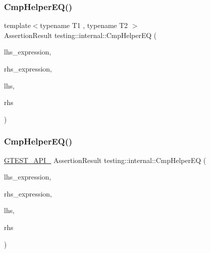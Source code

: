 \mbox{\label{namespacetesting_1_1internal_a4638c74d9b32e971f9b321af6fafc2f1}} 
\subsubsection{\texorpdfstring{Cmp\+Helper\+E\+Q()}{CmpHelperEQ()}\hspace{0.1cm}{\footnotesize\ttfamily [1/2]}}
{\footnotesize\ttfamily template$<$typename T1 , typename T2 $>$ \\
Assertion\+Result testing\+::internal\+::\+Cmp\+Helper\+EQ (\begin{DoxyParamCaption}\item[{const char $\ast$}]{lhs\+\_\+expression,  }\item[{const char $\ast$}]{rhs\+\_\+expression,  }\item[{const T1 \&}]{lhs,  }\item[{const T2 \&}]{rhs }\end{DoxyParamCaption})}

\mbox{\label{namespacetesting_1_1internal_a1edf90480571c0659a39d13e3777d9ce}} 
\subsubsection{\texorpdfstring{Cmp\+Helper\+E\+Q()}{CmpHelperEQ()}\hspace{0.1cm}{\footnotesize\ttfamily [2/2]}}
{\footnotesize\ttfamily \hyperlink{gtest-port_8h_aa73be6f0ba4a7456180a94904ce17790}{G\+T\+E\+S\+T\+\_\+\+A\+P\+I\+\_\+} Assertion\+Result testing\+::internal\+::\+Cmp\+Helper\+EQ (\begin{DoxyParamCaption}\item[{const char $\ast$}]{lhs\+\_\+expression,  }\item[{const char $\ast$}]{rhs\+\_\+expression,  }\item[{\hyperlink{namespacetesting_1_1internal_a05c6bd9ede5ccdf25191a590d610dcc6}{Biggest\+Int}}]{lhs,  }\item[{\hyperlink{namespacetesting_1_1internal_a05c6bd9ede5ccdf25191a590d610dcc6}{Biggest\+Int}}]{rhs }\end{DoxyParamCaption})}

